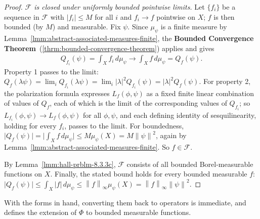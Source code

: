 \begin{proof}
\textit{$\mathcal{F}$ is closed under uniformly bounded pointwise limits.} Let $\{f_i\}$ be a sequence in $\mathcal{F}$ with $\lvert f_i \rvert \le M$ for all $i$ and $f_i \to f$ pointwise on $X$; $f$ is then bounded (by $M$) and measurable. Fix $\psi$. Since $\mu_\psi$ is a finite measure by Lemma~\ref{lmm:abstract-associated-measures-finite}, the \textbf{Bounded Convergence Theorem}~(\ref{thrm:bounded-convergence-theorem}) applies and gives
\begin{align}
    Q_{f_i}(\psi) = \int_X f_i \, d\mu_\psi \longrightarrow \int_X f \, d\mu_\psi = Q_f(\psi).
\end{align}
Property 1 passes to the limit: $Q_f(\lambda\psi) = \lim_i Q_{f_i}(\lambda\psi) = \lim_i \lvert\lambda\rvert^2 Q_{f_i}(\psi) = \lvert\lambda\rvert^2 Q_f(\psi)$. For property 2, the polarization formula expresses $L_f(\phi,\psi)$ as a fixed finite linear combination of values of $Q_f$, each of which is the limit of the corresponding values of $Q_{f_i}$; so $L_{f_i}(\phi,\psi) \to L_f(\phi,\psi)$ for all $\phi,\psi$, and each defining identity of sesquilinearity, holding for every $f_i$, passes to the limit. For boundedness, $\lvert Q_f(\psi) \rvert = \lvert \int_X f \, d\mu_\psi \rvert \le M\mu_\psi(X) = M\left\| \psi \right\|^2$, again by Lemma~\ref{lmm:abstract-associated-measures-finite}. So $f \in \mathcal{F}$.

By Lemma~\ref{lmm:hall-prblm-8.3.3c}, $\mathcal{F}$ consists of all bounded Borel-measurable functions on $X$. Finally, the stated bound holds for every bounded measurable $f$: $\lvert Q_f(\psi) \rvert \le \int_X \lvert f \rvert \, d\mu_\psi \le \left\| f \right\|_\infty \mu_\psi(X) = \left\| f \right\|_\infty\left\| \psi \right\|^2$.
\end{proof}

With the forms in hand, converting them back to operators is immediate, and defines the extension of $\Phi$ to bounded measurable functions.

